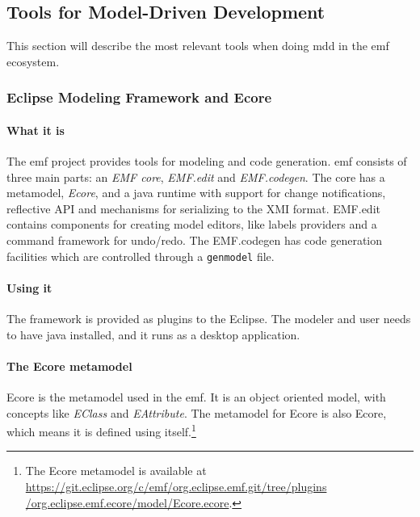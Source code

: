 \subsection{Tools for Model-Driven Development}

This section will describe the most relevant tools when doing \acrfull{mdd} in the \acrlong{emf} ecosystem.

\subsubsection{Eclipse Modeling Framework and Ecore}

\paragraph*{What it is}
The \acrfull{emf} project provides tools for modeling and code generation.
\Acrshort{emf} consists of three main parts: an \emph{EMF core}, \emph{EMF.edit} and \emph{EMF.codegen}.
The core has a \gls{metamodel}, \emph{Ecore}, and a java runtime with support for change notifications, reflective \gls{API} and mechanisms for serializing to the XMI format. EMF.edit contains components for creating model editors, like labels providers and a command framework for undo/redo.
The EMF.codegen has code generation facilities which are controlled through a \texttt{genmodel} file.\cite{gronbackEclipseModelingProject}

\paragraph*{Using it} The framework is provided as plugins to the \gls{Eclipse}.
The modeler and user needs to have java installed, and it runs as a desktop application.

\paragraph*{The Ecore metamodel}
\Gls{Ecore} is the \gls{metamodel} used in the \acrlong{emf}.
It is an object oriented model, with concepts like \emph{EClass} and \emph{EAttribute}.
The \gls{metamodel} for Ecore is also Ecore, which means it is defined using itself.\footnote{The Ecore metamodel is available at \href{https://git.eclipse.org/c/emf/org.eclipse.emf.git/tree/plugins/org.eclipse.emf.ecore/model/Ecore.ecore}{https://git.eclipse.org/c/emf/org.eclipse.emf.git/tree/plugins /org.eclipse.emf.ecore/model/Ecore.ecore}.}

